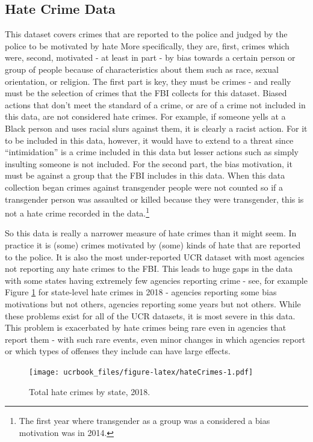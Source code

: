 \documentclass[
  12pt,
  openany]{book}
\begin{document}
\hypertarget{hate-crime-data}{%
\subsection{Hate Crime Data}\label{hate-crime-data}}

This dataset covers crimes that are reported to the police and judged by the police to be motivated by hate More specifically, they are, first, crimes which were, second, motivated - at least in part - by bias towards a certain person or group of people because of characteristics about them such as race, sexual orientation, or religion. The first part is key, they must be crimes - and really must be the selection of crimes that the FBI collects for this dataset. Biased actions that don't meet the standard of a crime, or are of a crime not included in this data, are not considered hate crimes. For example, if someone yells at a Black person and uses racial slurs against them, it is clearly a racist action. For it to be included in this data, however, it would have to extend to a threat since ``intimidation'' is a crime included in this data but lesser actions such as simply insulting someone is not included. For the second part, the bias motivation, it must be against a group that the FBI includes in this data. When this data collection began crimes against transgender people were not counted so if a transgender person was assaulted or killed because they were transgender, this is not a hate crime recorded in the data.\footnote{The first year where transgender as a group was a considered a bias motivation was in 2014.}

So this data is really a narrower measure of hate crimes than it might seem. In practice it is (some) crimes motivated by (some) kinds of hate that are reported to the police. It is also the most under-reported UCR dataset with most agencies not reporting any hate crimes to the FBI. This leads to huge gaps in the data with some states having extremely few agencies reporting crime - see, for example Figure \ref{fig:hateCrimes} for state-level hate crimes in 2018 - agencies reporting some bias motivations but not others, agencies reporting some years but not others. While these problems exist for all of the UCR datasets, it is most severe in this data. This problem is exacerbated by hate crimes being rare even in agencies that report them - with such rare events, even minor changes in which agencies report or which types of offenses they include can have large effects.

\begin{figure}
\centering
\texttt{[image: ucrbook\_files/figure-latex/hateCrimes-1.pdf]}
\caption{\label{fig:hateCrimes}Total hate crimes by state, 2018.}
\end{figure}
\end{document}

